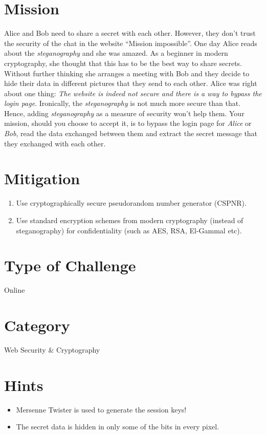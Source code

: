 \documentclass[11pt]{article}
\begin{document}
\section{Mission}
Alice and Bob need to share a secret with each other. However, they don't trust the security of the chat in the website ``Mission impossible''. One day Alice reads about the \textit{steganography} and she was amazed. As a beginner in modern cryptography, she thought that this has to be the best way to share secrets. Without further thinking she arranges a meeting with Bob and they decide to hide their data in different pictures that they send to each other. Alice was right about one thing: \textit{The website is indeed not secure and there is a way to bypass the login page}. Ironically, the \textit{steganography} is not much more secure than that. Hence, adding \textit{steganography} as a measure of security won't help them. Your mission, should you choose to accept it, is to bypass the login page for \textit{Alice} or \textit{Bob}, read the data exchanged between them and extract the secret message that they exchanged with each other.

\section{Mitigation}
\begin{enumerate}
\item Use cryptographically secure pseudorandom number generator (CSPNR).
\item Use standard encryption schemes from modern cryptography (instead of steganography) for confidentiality (such as AES, RSA, El-Gammal etc).
\end{enumerate}


\section{Type of Challenge}
Online

\section{Category}
Web Security \& Cryptography

\section{Hints}
\begin{itemize}
\item Mersenne Twister is used to generate the session keys!
\item The secret data is hidden in only some of the bits in every pixel.
\end{itemize}
\end{document}
